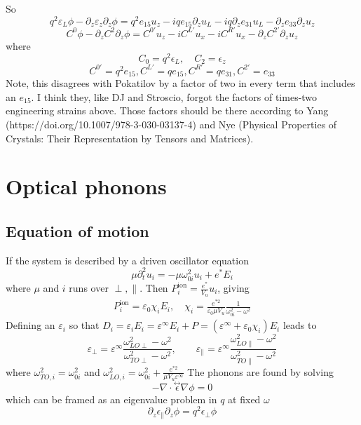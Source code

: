 \documentclass{article}
\begin{document}
So
\begin{equation}
  q^2\varepsilon_L\phi -\partial_z\varepsilon_z \partial_z \phi 
    =q^2e_{15}u_z-iqe_{15}\partial_zu_L
    -iq \partial_z e_{31}u_L- \partial_ze_{33}\partial_zu_z
\end{equation}
\begin{equation}
  C^0\phi -\partial_z C^2\partial_z\phi = C^{0'}u_z-iC^{L'}u_x-iC^{R'}u_x-\partial_zC^{2'}\partial_zu_z
\end{equation}
where
\begin{equation}
  C_0=q^2\epsilon_L, \quad C_2=\epsilon_z
\end{equation}
\begin{equation}
  C^{0'}=q^2e_{15},
  C^{L'}=qe_{15}, 
  C^{R'}=qe_{31}, 
  C^{2'}=e_{33}
\end{equation}
Note, this disagrees with Pokatilov by a factor of two in every term that includes an $e_{15}$.  I think they, like DJ and Stroscio, forgot the factors of times-two engineering strains above.  Those factors should be there according to Yang (https://doi.org/10.1007/978-3-030-03137-4) and Nye (Physical Properties of Crystals: Their Representation by Tensors and Matrices).

\section{Optical phonons}
\subsection{Equation of motion}
If the system is described by a driven oscillator equation
\begin{equation}
  \mu\partial_t^2u_i =-\mu\omega_{0i}^2u_i+e^* E_i
\end{equation}
where $\mu$ and $i$ runs over $\perp, \parallel$. Then $P^\mathrm{ion}_i=\frac{e^*}{V_u}u_i$, giving
\begin{align}
  P^\mathrm{ion}_i =\varepsilon_0\chi_iE_i, \quad \chi_i=\frac{e^{*2}}{\varepsilon_0\mu V_u}\frac{1}{\omega_{0i}^2-\omega^2} 
\end{align}
Defining an $\varepsilon_i$ so that $D_i=\varepsilon_i E_i=\varepsilon^\infty E_i +P=(\varepsilon^\infty +\varepsilon_0\chi_i) E_i$ leads to 
\begin{equation}
  \varepsilon_\perp=\varepsilon^\infty\frac{\omega_{LO\perp}^2-\omega^2}{\omega_{TO\perp}^2-\omega^2},
  \quad\quad
  \varepsilon_\parallel=\varepsilon^\infty\frac{\omega_{LO\parallel}^2-\omega^2}{\omega_{TO\parallel}^2-\omega^2}
\end{equation}
where $\omega_{TO,i}^2=\omega_{0i}^2$ and $\omega_{LO, i}^2=\omega_{0i}^2+\frac{e^{*2}}{\mu V_u\varepsilon^\infty}$
The phonons are found by solving
\begin{equation}
  -\nabla\cdot\overset\leftrightarrow{\epsilon}\nabla\phi=0
\end{equation}
which can be framed as an eigenvalue problem in $q$ at fixed $\omega$
\begin{equation}
  \partial_z\epsilon_\parallel\partial_z\phi=q^2\epsilon_\perp\phi
\end{equation}
\end{document}
